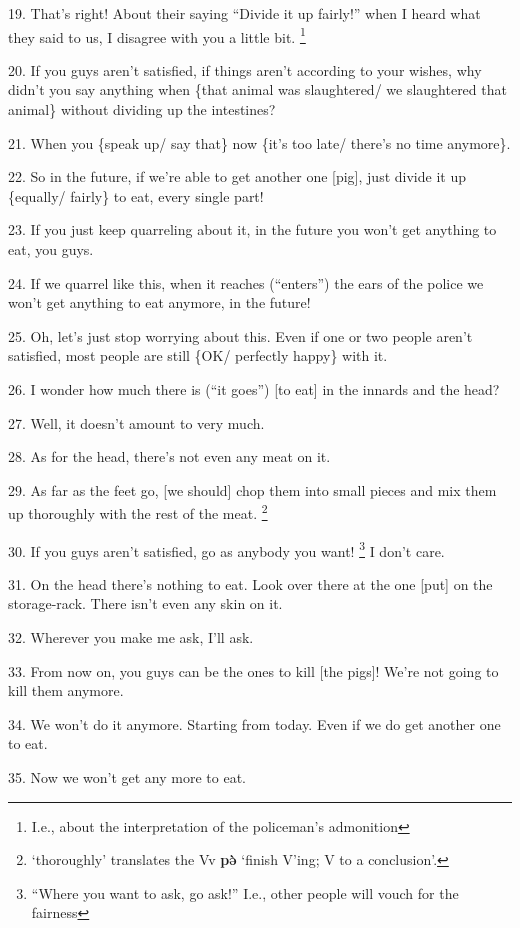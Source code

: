 {19. That's right! About their saying ``Divide it up fairly!'' when I heard what
they said to us, I disagree with you a little bit. \footnote{I.e., about the interpretation of the policeman's admonition}

20. If you guys aren't satisfied, if things aren't according to your wishes, why
didn't you say anything when \{that animal was slaughtered/ we slaughtered that
animal\} without dividing up the intestines?

21. When you \{speak up/ say that\} now \{it's too late/ there's no time anymore\}.

22. So in the future, if we're able to get another one [pig], just divide it up
\{equally/ fairly\} to eat, every single part!

23. If you just keep quarreling about it, in the future you won't get anything
to eat, you guys.

24. If we quarrel like this, when it reaches (``enters'') the ears of the police
we won't get anything to eat anymore, in the future!

25. Oh, let's just stop worrying about this. Even if one or two people aren't satisfied,
most people are still \{OK/ perfectly happy\} with it.

26. I wonder how much there is (``it goes'') [to eat] in the innards and the head?

27. Well, it doesn't amount to very much.

28. As for the head, there's not even any meat on it.

29. As far as the feet go, [we should] chop them into small pieces and mix them
up thoroughly with the rest of the meat. \footnote{`thoroughly' translates the Vv \textbf{pə̀} `finish V'ing; V to a conclusion'.}

30. If you guys aren't satisfied, go as anybody you want! \footnote{``Where you want to ask, go ask!'' I.e., other people will vouch for the fairness} I don't care.

31. On the head there's nothing to eat. Look over there at the one [put] on the
storage-rack. There isn't even any skin on it.

32. Wherever you make me ask, I'll ask.

33. From now on, you guys can be the ones to kill [the pigs]! We're not going to
kill them anymore.

34. We won't do it anymore. Starting from today. Even if we do get another one
to eat.

35. Now we won't get any more to eat.

}
